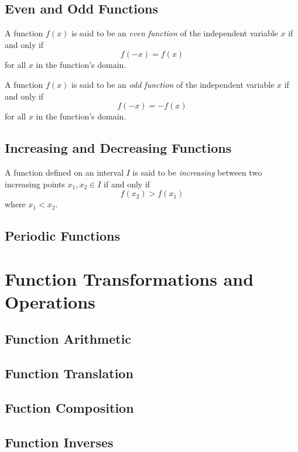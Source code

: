 \subsection{Even and Odd Functions}
\begin{definition}
    A function $f(x)$ is said to be an \textit{even function} of the independent variable $x$ if and only if
    $$
    f(-x) = f(x)
    $$
    for all $x$ in the function's domain.
\end{definition}

\begin{definition}
    A function $f(x)$ is said to be an \textit{odd function} of the independent variable $x$ if and only if
    $$
    f(-x) = -f(x)
    $$
    for all $x$ in the function's domain.
\end{definition}

\subsection{Increasing and Decreasing Functions}
\begin{definition}
    A function defined on an interval $I$ is said to be \textit{increasing} between two increasing points $x_1, x_2 \in I$ if and only if
    $$
    f(x_2) > f(x_1)
    $$
    where $x_1 < x_2$.
\end{definition}

\subsection{Periodic Functions}

\section{Function Transformations and Operations}
\subsection{Function Arithmetic}
\subsection{Function Translation}
\subsection{Fuction Composition}
\subsection{Function Inverses}

